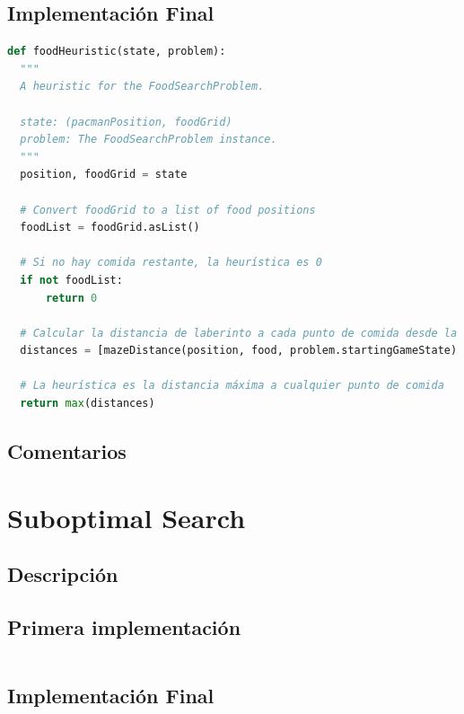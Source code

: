 \documentclass{report}
\begin{document}
        \subsection*{Implementación Final}
          \begin{lstlisting}[language=Python, caption=Implementación final de la heurística del problema de las esquinas]
def foodHeuristic(state, problem):
  """
  A heuristic for the FoodSearchProblem.
  
  state: (pacmanPosition, foodGrid)
  problem: The FoodSearchProblem instance.
  """
  position, foodGrid = state

  # Convert foodGrid to a list of food positions
  foodList = foodGrid.asList()

  # Si no hay comida restante, la heurística es 0
  if not foodList:
      return 0

  # Calcular la distancia de laberinto a cada punto de comida desde la posición actual de Pacman
  distances = [mazeDistance(position, food, problem.startingGameState) for food in foodList]

  # La heurística es la distancia máxima a cualquier punto de comida
  return max(distances)
          \end{lstlisting}
        \subsection*{Comentarios}
      \clearpage\section{Suboptimal Search}
        \subsection*{Descripción}
        \subsection*{Primera implementación}
          \begin{lstlisting}[language=Python, caption=Implementación inicial del problema de las esquinas]
          \end{lstlisting}
        \subsection*{Implementación Final}
          \begin{lstlisting}[language=Python, caption=Implementación final del problema de las esquinas]
          \end{lstlisting}
\end{document}
